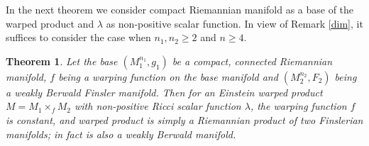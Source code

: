 \documentclass[pdflatex,sn-mathphys-num]{sn-jnl}%
\theoremstyle{thmstyleone}%
\newtheorem{theorem}{Theorem}%
\theoremstyle{thmstyletwo}%
\theoremstyle{thmstylethree}%
\begin{document}
\bigskip


In the next theorem we consider compact Riemannian manifold 
as a base of the warped product and $\lambda$ as non-positive scalar function. In view of Remark \ref{dim},  it suffices to consider the  case when  $n_1, n_2 \geq  2$ and $n \geq 4$. 

\vspace{0.15in}
 
\begin{theorem}\label{mainf}
	Let the base $(M_1^{n_1},g_1)$ be a compact, connected Riemannian manifold, $f$ being a  warping function on the base manifold and $(M_2^{n_2},F_2)$ being a weakly Berwald Finsler manifold. Then for an Einstein warped product $M=M_1\times_f M_2$ with non-positive Ricci scalar function $\lambda$, the
 warping function $f$ is constant, and warped product  
 is simply a Riemannian product of two Finslerian manifolds;
 in fact is also a weakly Berwald manifold.
	\end{theorem}
\end{document}
